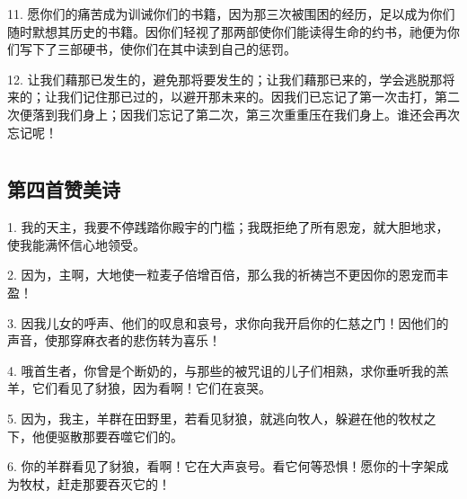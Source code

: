 11. 愿你们的痛苦成为训诫你们的书籍，因为那三次被围困的经历，足以成为你们随时默想其历史的书籍。因你们轻视了那两部使你们能读得生命的约书，祂便为你们写下了三部硬书，使你们在其中读到自己的惩罚。\par

12. 让我们藉那已发生的，避免那将要发生的；让我们藉那已来的，学会逃脱那将来的；让我们记住那已过的，以避开那未来的。因我们已忘记了第一次击打，第二次便落到我们身上；因我们忘记了第二次，第三次重重压在我们身上。谁还会再次忘记呢！\par



\section{}


\subsection{第四首赞美诗}

1. 我的天主，我要不停践踏你殿宇的门槛；我既拒绝了所有恩宠，就大胆地求，使我能满怀信心地领受。\par

2. 因为，主啊，大地使一粒麦子倍增百倍，那么我的祈祷岂不更因你的恩宠而丰盈！\par

3. 因我儿女的呼声、他们的叹息和哀号，求你向我开启你的仁慈之门！因他们的声音，使那穿麻衣者的悲伤转为喜乐！\par

4. 哦首生者，你曾是个断奶的，与那些的被咒诅的儿子们相熟，求你垂听我的羔羊，它们看见了豺狼，因为看啊！它们在哀哭。\par

5. 因为，我主，羊群在田野里，若看见豺狼，就逃向牧人，躲避在他的牧杖之下，他便驱散那要吞噬它们的。\par

6. 你的羊群看见了豺狼，看啊！它在大声哀号。看它何等恐惧！愿你的十字架成为牧杖，赶走那要吞灭它的！\par

